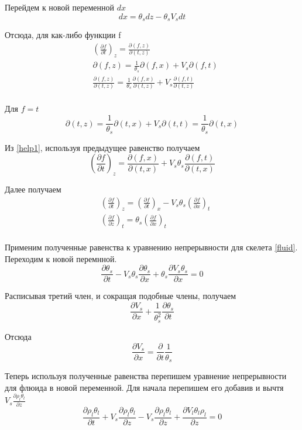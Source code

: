 \documentclass[12pt]{article}
\newcommand{\pd}[2]{\frac{\partial #1}{\partial #2}}
\begin{document}
Перейдем к новой переменной $dx$
\begin{equation}
dx = \theta_s dz - \theta_s V_s dt
\label{dx_dz}
\end{equation}

Отсюда, для как-либо функции f 
\begin{equation}
\begin{aligned}
&\left(\pd{f}{t}\right)_z = \pd{(f , z)}{(t , z)}\\
&\partial(f , z) = \frac{1}{\theta_s}\partial(f , x) + V_s \partial(f , t)\\
&\pd{(f , z)}{(t , z)} = \frac{1}{\theta_s}\pd{(f , x)}{(t , z)} + V_s\pd{(f , t)}{(t , z)}\\
\end{aligned}
\label{help1}
\end{equation}

Для $ f = t $ 
$$
\partial(t , z) = \frac{1}{\theta_s} \partial(t , x) + V_s \partial(t , t) = \frac{1}{\theta_s} \partial(t , x)
$$

Из \eqref{help1}, используя предыдущее равенство получаем
$$
\left(\pd{f}{t}\right)_z = \pd{(f , x)}{(t , x)} + V_s \theta_s\pd{(f ,t)}{(t , x)}
$$

Далее получаем
\begin{equation}
\begin{aligned}
&\left(\pd{f}{t}\right)_z = \left(\pd{f}{t}\right)_x - V_s\theta_s\left(\pd{f}{x}\right)_t\\
&\left(\pd{f}{z}\right)_t = \theta_s\left(\pd{f}{x}\right)_t\\
\end{aligned}
\label{z_x}
\end{equation}

Применим полученные равенства к уравнению непрерывности для скелета \eqref{fluid}. Переходим к новой перемнной.
$$
\pd{\theta_s}{t} - V_s\theta_s\pd{\theta_s}{x} + \theta_s\pd{V_s\theta_s}{x} =0
$$

Расписывая третий член, и сокращая подобные члены, получаем
$$
\pd{V_s}{x} + \frac{1}{\theta_s^2}\pd{\theta_s}{t}
$$

Отсюда
\begin{equation}
\pd{V_s}{x} = \pd{}{t}\frac{1}{\theta_s}
\label{V_s}
\end{equation}

Теперь используя полученные равенства перепишем уравнение непрерывности для флюида в новой переменной. Для начала перепишем его добавив и вычтя $V_s\pd{\rho_l\theta_l}{z} $
$$
\pd{\rho_l\theta_l}{t} + V_s\pd{\rho_l\theta_l}{z} - V_s\pd{\rho_l\theta_l}{z} + \pd{V_l\theta_l\rho_l}{z} =0
$$
\end{document}
